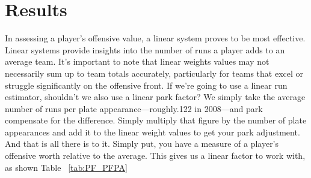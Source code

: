 \documentclass[12pt]{article}
\begin{document}
\section{Results}
\label{sec:resu}
In assessing a player's offensive value, a linear system proves to be most effective. Linear systems
provide insights into the number of runs a player adds to an average team. It's important 
to note that linear weights values may not necessarily sum up to team totals accurately, 
particularly for teams that excel or struggle significantly on the offensive front. If we're going to use a 
linear run estimator, shouldn't we also use a linear park factor? We simply 
take the average number of runs per plate appearance—roughly.122 in 2008—and park compensate for the 
difference. Simply multiply that figure by the number of plate appearances and add it to the 
linear weight values to get your park adjustment. And that is all there is to it. Simply put, 
you have a measure of a player's offensive worth relative to the average.
This gives us a linear factor to work with, as shown Table~ \ref*{tab:PF_PFPA}

\begin{table}[ht]
  \caption{Park value formula and its per plate appearance in each team}
  \label{tab:PF_PFPA} 
  \centering
  \cite*{web:Wyers:Part3}
\end{table}
\end{document}

